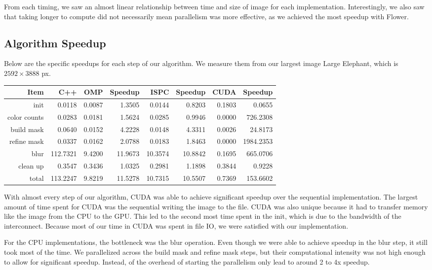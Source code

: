 \documentclass[12pt]{article}
\begin{document}
From each timing, we saw an almost linear relationship between time and size of
image for each implementation. Interestingly, we also saw that taking longer to
compute did not necessarily mean parallelism was more effective, as we achieved
the most speedup with Flower.

\subsection{Algorithm Speedup}

Below are the specific speedups for each step of our algorithm. We measure them
from our largest image Large Elephant, which is $2592 \times 3888$ px.

\begin{tabular}{r|r|r|r|r|r|r|r}
    Item & C++ & OMP & Speedup & ISPC & Speedup & CUDA & Speedup
\\  \hline
    init & 0.0118 & 0.0087 & 1.3505 & 0.0144 & 0.8203 & 0.1803 & 0.0655
\\  color counts & 0.0283 & 0.0181 & 1.5624 & 0.0285 & 0.9946 & 0.0000 & 726.2308
\\  build mask & 0.0640 & 0.0152 & 4.2228 & 0.0148 & 4.3311 & 0.0026 & 24.8173
\\  refine mask & 0.0337 & 0.0162 & 2.0788 & 0.0183 & 1.8463 & 0.0000 & 1984.2353
\\  blur & 112.7321 & 9.4200 & 11.9673 & 10.3574 & 10.8842 & 0.1695 & 665.0706
\\  clean up & 0.3547 & 0.3436 & 1.0325 & 0.2981 & 1.1898 & 0.3844 & 0.9228
\\  \hline
    total & 113.2247 & 9.8219 & 11.5278 & 10.7315 & 10.5507 & 0.7369 & 153.6602
\end{tabular}

With almost every step of our algorithm, CUDA was able to achieve significant
speedup over the sequential implementation. The largest amount of time spent
for CUDA was the sequential writing the image to the file. CUDA was also unique
because it had to transfer memory like the image from the CPU to the GPU. This
led to the second most time spent in the init, which is due to the bandwidth of
the interconnect. Because most of our time in CUDA was spent in file IO, we
were satisfied with our implementation.

For the CPU implementations, the bottleneck was the blur operation. Even though
we were able to achieve speedup in the blur step, it still took most of the
time. We parallelized across the build mask and refine mask steps, but their
computational intensity was not high enough to allow for significant speedup.
Instead, of the overhead of starting the parallelism only lead to around 2 to
4x speedup.
\end{document}
